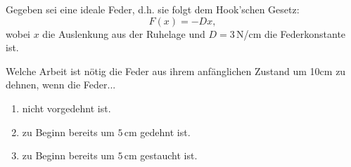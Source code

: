 \begin{ExerciseBlock}
Gegeben sei eine ideale Feder, d.h. sie folgt dem Hook'schen Gesetz: \[ F(x) = -D x,\] wobei $x$ die Auslenkung aus der Ruhelage und $D = 3\,$N/cm die Federkonstante ist.

Welche Arbeit ist nötig die Feder aus ihrem anfänglichen Zustand um 10cm zu dehnen, wenn die Feder...

\begin{enumerate}
	\item nicht vorgedehnt ist.

	\item zu Beginn bereits um $5\,$cm gedehnt ist.

	\item zu Beginn bereits um $5\,$cm gestaucht ist.
\end{enumerate}
\end{ExerciseBlock}
